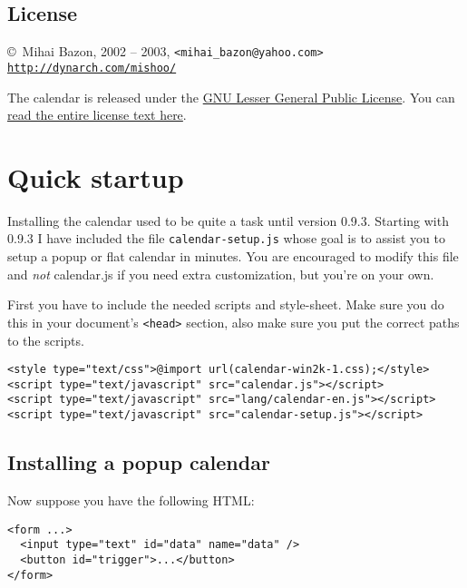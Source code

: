 \documentclass[a4paper,10pt]{article}
\begin{document}
\subsection{License}

\begin{center}
\noindent \copyright\ Mihai Bazon, 2002 -- 2003, \texttt{<mihai\_bazon@yahoo.com>}\\
\href{http://dynarch.com/mishoo/}{\texttt{http://dynarch.com/mishoo/}}\\
\end{center}

The calendar is released under the
{\href{http://www.gnu.org/licenses/lgpl.html}{GNU Lesser General Public License}}.  You
can {\href{http://www.gnu.org/licenses/lgpl.html}{read the entire license text
here}}.




\section{Quick startup}\label{sec:quick-start}

Installing the calendar used to be quite a task until version 0.9.3.  Starting
with 0.9.3 I have included the file \texttt{calendar-setup.js} whose goal is to
assist you to setup a popup or flat calendar in minutes.  You are
encouraged to modify this file and \emph{not} calendar.js if you need
extra customization, but you're on your own.

First you have to include the needed scripts and style-sheet.  Make sure you do
this in your document's \texttt{<head>} section, also make sure you put the
correct paths to the scripts.

\begin{verbatim}
<style type="text/css">@import url(calendar-win2k-1.css);</style>
<script type="text/javascript" src="calendar.js"></script>
<script type="text/javascript" src="lang/calendar-en.js"></script>
<script type="text/javascript" src="calendar-setup.js"></script>
\end{verbatim}

\subsection{Installing a popup calendar}\label{sec:quick-start-popup}

\noindent Now suppose you have the following HTML:

\begin{verbatim}
<form ...>
  <input type="text" id="data" name="data" />
  <button id="trigger">...</button>
</form>
\end{verbatim}
\end{document}
